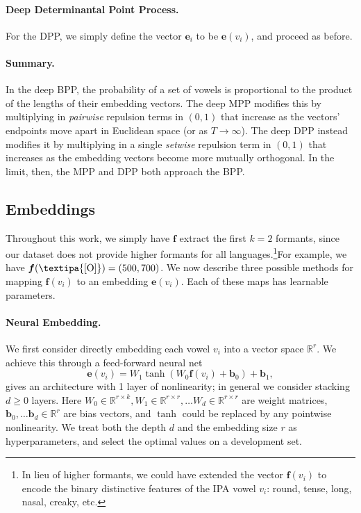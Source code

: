 \documentclass[11pt,a4paper]{article}
\renewcommand{\vec}[1]{{\boldsymbol{\mathbf{#1}}}}
\newcommand{\Real}{\mathbb{R}}
\newcommand{\e}{{\boldsymbol e}}
\newcommand{\f}{{\boldsymbol f}}
\newcommand{\phone}[1]{\textipa{[#1]}}
\begin{document}
\paragraph{Deep Determinantal Point Process.}
For the DPP, we simply define the vector $\vec{e}_i$ to be $\e(v_i)$,
and proceed as before.

\paragraph{Summary.} In the deep BPP, the probability of a set of vowels is proportional to the product of the lengths of their embedding vectors.
The deep MPP modifies this by multiplying in {\em pairwise} repulsion terms in $(0,1)$ that increase as the vectors' endpoints move apart in Euclidean space (or as $T \rightarrow \infty$).  The deep DPP instead modifies it by multiplying in a single {\em setwise} repulsion term in $(0,1)$ that increases as the embedding vectors become more mutually orthogonal.  In the limit, then, the MPP and DPP both approach the BPP.

\subsection{Embeddings}\label{sec:embed}

Throughout this work, we simply have $\f$ extract the first $k=2$
formants, since our dataset does not provide higher formants for all
languages.\footnote{\label{fn:richf}In lieu of higher formants, we
  could have extended the vector $\f(v_i)$ to encode the binary
  distinctive features of the IPA vowel $v_i$: round, tense, long,
  nasal, creaky, etc.}For example, we have
$\f(\text{\phone{O}}) = (500, 700)$.
We now describe three possible methods for mapping $\f(v_i)$ to an
embedding $\e(v_i)$.  Each of these maps has learnable parameters.

\paragraph{Neural Embedding.}

We first consider directly embedding each vowel $v_i$ into
a vector space $\Real^r$.  We achieve this through a 
feed-forward neural net
\begin{equation}\label{eq:deep}
\e(v_i) = W_1 \tanh\left(W_0\f(v_i) +  \vec{b}_0
\right) +\vec{b}_1,
\end{equation}
 gives an architecture with 1 layer of nonlinearity;
in general we consider stacking $d \geq 0$ layers.  Here
$W_0 \in \Real^{r \times k}, W_1 \in \Real^{r \times
  r}, \ldots W_d \in \Real^{r \times r}$ are weight matrices, $\vec{b}_0, \ldots \vec{b}_d \in \Real^{r}$
are bias vectors, and $\tanh$ could be replaced by any pointwise
nonlinearity. 
We treat both the depth $d$ and the embedding size $r$ as hyperparameters,
and select the optimal values on a development set.
\end{document}

